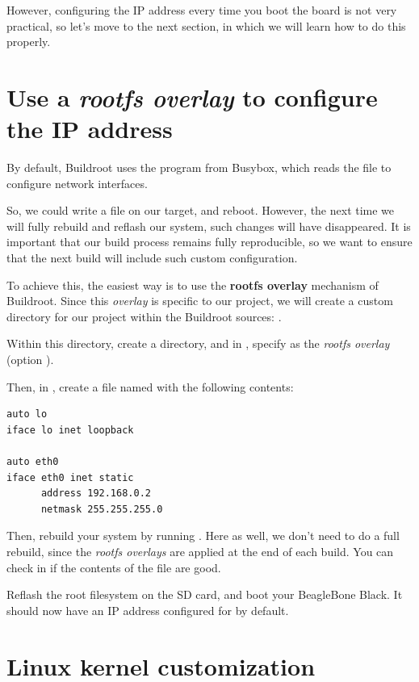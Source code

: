 However, configuring the IP address every time you boot the board is
not very practical, so let's move to the next section, in which we
will learn how to do this properly.

\section{Use a {\em rootfs overlay} to configure the IP address}

By default, Buildroot uses the  program from Busybox, which
reads the  file to configure network
interfaces.

So, we could write a  file on our
target, and reboot. However, the next time we will fully rebuild and
reflash our system, such changes will have disappeared. It is
important that our build process remains fully reproducible, so we
want to ensure that the next build will include such custom
configuration.

To achieve this, the easiest way is to use the {\bf rootfs overlay}
mechanism of Buildroot. Since this {\em overlay} is specific to our
project, we will create a custom directory for our project within the
Buildroot sources: .

Within this directory, create a  directory, and
in , specify
 as the {\em rootfs
overlay} (option ).

Then, in , create a
file named  with the following contents:

\begin{verbatim}
auto lo
iface lo inet loopback

auto eth0
iface eth0 inet static
      address 192.168.0.2
      netmask 255.255.255.0
\end{verbatim}

Then, rebuild your system by running . Here as well, we
don't need to do a full rebuild, since the {\em rootfs overlays} are
applied at the end of each build. You can check in
 if the contents of the
file are good.

Reflash the root filesystem on the SD card, and boot your BeagleBone
Black. It should now have an IP address configured for  by
default.

\section{Linux kernel customization}

